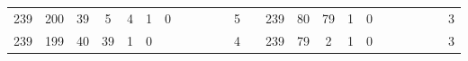 {\begin{tabular}{cccccccccccclccccccccccc}
239                                                & 200                                                & 39                                               & 5                                                & 4                                                & 1                                                & 0                                               &                                                 &                                                 &                                                 &                                                 & 5                                                &                          & 239                                                & 80                                                 & 79                                               & 1                                                & 0                                               &                                                 &                                                 &                                                 &                                                 &                                                 & 3                                                \\
239                                                & 199                                                & 40                                               & 39                                               & 1                                                & 0                                                &                                                 &                                                 &                                                 &                                                 &                                                 & 4                                                &                          & 239                                                & 79                                                 & 2                                                & 1                                                & 0                                               &                                                 &                                                 &                                                 &                                                 &                                                 & 3                                                \\

\end{tabular}}
